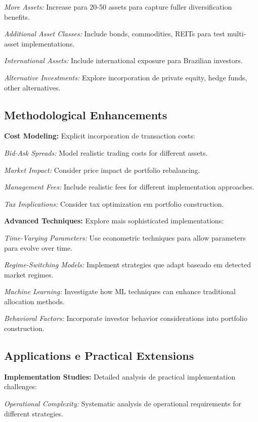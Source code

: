 \textit{More Assets:} Increase para 20-50 assets para capture fuller diversification benefits.

\textit{Additional Asset Classes:} Include bonds, commodities, REITs para test multi-asset implementations.

\textit{International Assets:} Include international exposure para Brazilian investors.

\textit{Alternative Investments:} Explore incorporation de private equity, hedge funds, other alternatives.

\subsection{Methodological Enhancements}

\textbf{Cost Modeling:} Explicit incorporation de transaction costs:

\textit{Bid-Ask Spreads:} Model realistic trading costs for different assets.

\textit{Market Impact:} Consider price impact de portfolio rebalancing.

\textit{Management Fees:} Include realistic fees for different implementation approaches.

\textit{Tax Implications:} Consider tax optimization em portfolio construction.

\textbf{Advanced Techniques:} Explore mais sophisticated implementations:

\textit{Time-Varying Parameters:} Use econometric techniques para allow parameters para evolve over time.

\textit{Regime-Switching Models:} Implement strategies que adapt baseado em detected market regimes.

\textit{Machine Learning:} Investigate how ML techniques can enhance traditional allocation methods.

\textit{Behavioral Factors:} Incorporate investor behavior considerations into portfolio construction.

\subsection{Applications e Practical Extensions}

\textbf{Implementation Studies:} Detailed analysis de practical implementation challenges:

\textit{Operational Complexity:} Systematic analysis de operational requirements for different strategies.

